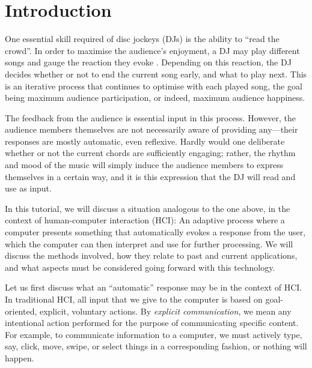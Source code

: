 \section{Introduction}

One essential skill required of disc jockeys (DJs) is the ability to ``read the crowd''. In order to maximise the audience's enjoyment, a DJ may play different songs and gauge the reaction they evoke \cite{gates2006dj}. Depending on this reaction, the DJ decides whether or not to end the current song early, and what to play next. This is an iterative process that continues to optimise with each played song, the goal being maximum audience participation, or indeed, maximum audience happiness.

The feedback from the audience is essential input in this process. However, the audience members themselves are not necessarily aware of providing any---their responses are mostly automatic, even reflexive. Hardly would one deliberate whether or not the current chords are sufficiently engaging; rather, the rhythm and mood of the music will simply induce the audience members to express themselves in a certain way, and it is this expression that the DJ will read and use as input.

In this tutorial, we will discuss a situation analogous to the one above, in the context of human-computer interaction (HCI): An adaptive process where a computer presents something that automatically evokes a response from the user, which the computer can then interpret and use for further processing. We will discuss the methods involved, how they relate to past and current applications, and what aspects must be considered going forward with this technology.

Let us first discuss what an ``automatic'' response may be in the context of HCI. In traditional HCI, all input that we give to the computer is based on goal-oriented, explicit, voluntary actions. By \emph{explicit communication}, we mean any intentional action performed for the purpose of communicating specific content. For example, to communicate information to a computer, we must actively type, say, click, move, swipe, or select things in a corresponding fashion, or nothing will happen. 

